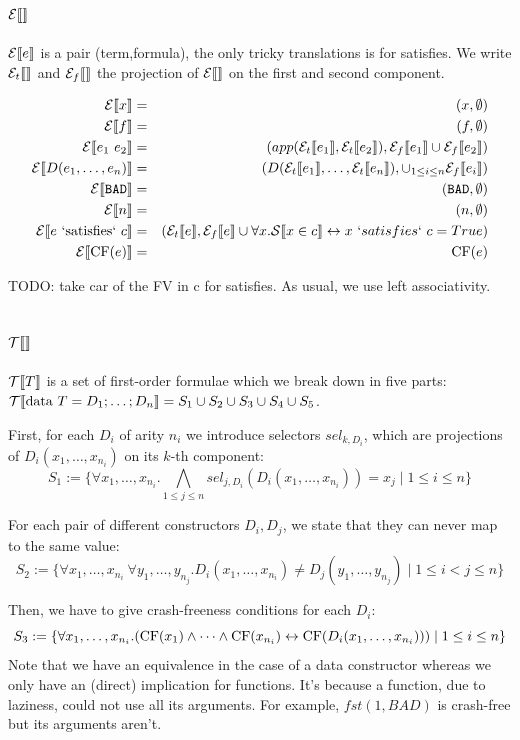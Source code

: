 \documentclass{article}
\begin{document}
\subsection{$\mathcal{E} \llbracket  \rrbracket$}
$\mathcal{E} \llbracket e \rrbracket$ is a pair (term,formula), the only tricky translations is
for satisfies.  We write $\mathcal{E}_t \llbracket  \rrbracket$ and $\mathcal{E}_{f} \llbracket  \rrbracket$ the projection
of $\mathcal{E} \llbracket  \rrbracket$ on the first and second component.

\begin{eqnarray}
\mathcal{E} \llbracket x \rrbracket &=& (x,\emptyset)\\
\mathcal{E} \llbracket f \rrbracket &=& (f,\emptyset)\\
\mathcal{E} \llbracket e_1~e_2 \rrbracket &=& (app(\mathcal{E}_t \llbracket e_1 \rrbracket,\mathcal{E}_t \llbracket e_2 \rrbracket),\mathcal{E}_{f} \llbracket e_1 \rrbracket \cup \mathcal{E}_{f} \llbracket e_2 \rrbracket)\\
\mathcal{E} \llbracket D(e_1,\dots,e_n) \rrbracket &=& (D(\mathcal{E}_t \llbracket e_1 \rrbracket,\dots,\mathcal{E}_t \llbracket e_n \rrbracket),\cup_{1 \leq i \leq n} \mathcal{E}_{f} \llbracket e_i \rrbracket)\\
\mathcal{E} \llbracket \texttt{BAD} \rrbracket &=& (\texttt{BAD},\emptyset)\\
\mathcal{E} \llbracket n \rrbracket &=& (n,\emptyset)\\
\mathcal{E} \llbracket e \mbox{ `satisfies` } c \rrbracket &=& (\mathcal{E}_t \llbracket e \rrbracket,\mathcal{E}_{f} \llbracket e \rrbracket \cup \forall x. \mathcal{S} \llbracket x \in c \rrbracket \leftrightarrow x~`satisfies`~c = True)\\
\mathcal{E} \llbracket \mbox{CF}(e) \rrbracket &=& \mbox{CF}(e)\\
\end{eqnarray}

TODO: take car of the FV in c for satisfies.
As usual, we use left associativity.

\subsection{$\mathcal{T} \llbracket  \rrbracket$}
$\mathcal{T} \llbracket T \rrbracket$ is a set of first-order formulae which we break down in five parts:
$\mathcal{T} \llbracket \mbox{data } T = D_1 ; \dots ; D_n \rrbracket = S_1 \cup S_2 \cup S_3 \cup S_4 \cup S_5$.

First, for each $D_i$ of arity $n_i$ we introduce selectors $sel_{k,D_i}$, which are projections of $D_i(x_1,\dots,x_n_i)$ on its $k$-th component:
$$S_1 := \{ \forall x_1,\dots,x_{n_i} . \bigwedge_{1 \leq j \leq n} sel_{j,D_i}(D_i(x_1,\dots,x_{n_i})) = x_j \mid 1 \leq i \leq n \}$$

For each pair of different constructors $D_i,D_j$, we state that they can never map to the same value: 
$$S_2 := \{ \forall x_1,\dots,x_{n_i}~\forall y_1,\dots,y_{n_j} . D_i(x_1,\dots,x_{n_i}) \neq D_j(y_1,\dots,y_{n_j}) \mid 1 \leq i < j \leq n \}$$

Then, we have to give crash-freeness conditions for each $D_i$:
$$S_3 := \{ \forall x_1,\dots,x_{n_i} . (\mbox{CF}(x_1) \land \dots \land \mbox{CF}(x_{n_i}) \leftrightarrow \mbox{CF}(D_i(x_1,\dots,x_{n_i}))) \mid 1 \leq i \leq n \}$$
Note that we have an equivalence in the case of a data constructor whereas we only have an (direct) implication for functions. It's because a function, due to laziness, could not use all its arguments. For example, $fst (1,BAD)$ is crash-free but its arguments aren't.
\end{document}
